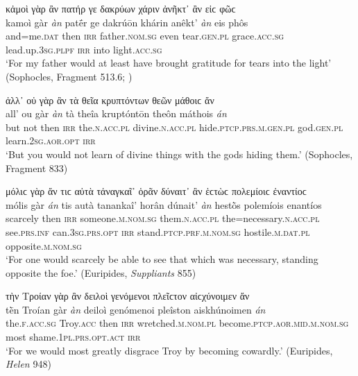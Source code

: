 \begin{exe}
\ex κἀμοὶ γὰρ ἂν πατήρ γε δακρύων χάριν ἀνῆκτ᾽ ἂν εἰϲ φῶϲ\\
\gll kamoì gàr \emph{àn} patḗr ge dakrúōn khárin anêkt' \emph{àn} eis phôs\\
and=me.\textsc{dat} then \textsc{irr} father.\textsc{nom.sg} even tear.\textsc{gen.pl} grace.\textsc{acc.sg} lead.up.\textsc{3sg.plpf} \textsc{irr} into light.\textsc{acc.sg}\\
\trans `For my father would at least have brought gratitude for tears into the light' (Sophocles, Fragment 513.6; \citealp[254]{Nauck1889})
\label{garan3}
\end{exe}

\begin{exe}
\ex ἀλλ᾽ οὐ γὰρ ἂν τὰ θεῖα κρυπτόντων θεῶν μάθοιϲ ἄν\\
\gll all' ou gàr \emph{àn} tà theîa kruptóntōn theôn máthois \emph{án}\\
but not then \textsc{irr} the.\textsc{n.acc.pl} divine\textsc{.n.acc.pl} hide.\textsc{ptcp.prs.m.gen.pl} god.\textsc{gen.pl} learn.\textsc{2sg.aor.opt} \textsc{irr}\\
\trans `But you would not learn of divine things with the gods hiding them.' (Sophocles, Fragment 833)
\label{garan4}
\end{exe}

\begin{exe}
\ex μόλιϲ γὰρ ἄν τιϲ αὐτὰ τἀναγκαῖ᾽ ὁρᾶν δύναιτ᾽ ἂν ἑϲτὼϲ πολεμίοιϲ ἐναντίοϲ\\
\gll mólis gàr \emph{án} tis autà tanankaî' horân dúnait' \emph{àn} hestṑs polemíois enantíos\\
scarcely then \textsc{irr} someone.\textsc{m.nom.sg} them.\textsc{n.acc.pl} the=necessary.\textsc{n.acc.pl} see.\textsc{prs.inf} can.\textsc{3sg.prs.opt} \textsc{irr} stand.\textsc{ptcp.prf.m.nom.sg} hostile.\textsc{m.dat.pl} opposite.\textsc{m.nom.sg}\\
\trans `For one would scarcely be able to see that which was necessary, standing opposite the foe.' (Euripides, \textit{Suppliants} 855)
\label{garan5}
\end{exe}

\begin{exe}
\ex τὴν Τροίαν γὰρ ἂν δειλοὶ γενόμενοι πλεῖϲτον αἰϲχύνοιμεν ἄν\\
\gll tḕn Troían gàr \emph{àn} deiloì genómenoi pleîston aiskhúnoimen \emph{án}\\
the.\textsc{f.acc.sg} Troy.\textsc{acc} then \textsc{irr} wretched.\textsc{m.nom.pl} become.\textsc{ptcp.aor.mid.m.nom.sg} most shame.\textsc{1pl.prs.opt.act} \textsc{irr}\\
\trans `For we would most greatly disgrace Troy by becoming cowardly.' (Euripides, \textit{Helen} 948)
\label{garan6}
\end{exe}

